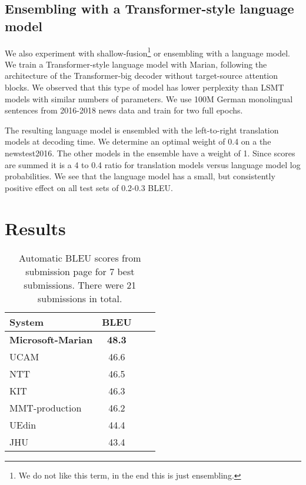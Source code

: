 \documentclass[11pt,a4paper]{article}
\begin{document}
\subsection{Ensembling with a Transformer-style language model}

We also experiment with shallow-fusion\footnote{We do not like this term, in the end this is just ensembling.} or ensembling with a language model. We train a Transformer-style language model with Marian, following the architecture of the Transformer-big decoder without target-source attention blocks. We observed that this type of model has lower perplexity than LSMT models with similar numbers of parameters. We use 100M German monolingual sentences from 2016-2018 news data and train for two full epochs. 

The resulting language model is ensembled with the left-to-right translation models at decoding time. We determine an optimal weight of 0.4 on a the newstest2016. The other models in the ensemble have a weight of 1. Since scores are summed it is a 4 to 0.4 ratio for translation models versus language model log probabilities. We see that the language model has a small, but consistently positive effect on all test sets of 0.2-0.3 BLEU. 

\section{Results}

\begin{table}[t]
  \centering
  \begin{tabular}{lccc}\toprule
  System &	BLEU \\ \midrule
  \sc\bf Microsoft-Marian & \bf 48.3 \\
  \sc UCAM & 46.6 \\
  \sc NTT & 46.5 \\
  \sc KIT & 46.3 \\
  \sc MMT-production & 46.2 \\
  \sc UEdin & 44.4 \\
  \sc JHU & 43.4 \\
  \bottomrule
  \end{tabular}
  \caption{Automatic BLEU scores from submission page for 7 best submissions. There were 21 submissions in total. }
  \label{10best}
  \end{table}
\end{document}
